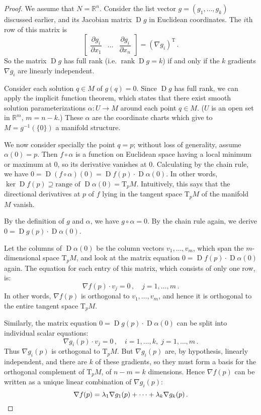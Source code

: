 \documentclass[12pt]{article}
\newcommand{\real}{\mathbb{R}}
\DeclareMathOperator{\D}{D}
\DeclareMathOperator{\rank}{rank}
\newcommand{\Tp}{\mathrm{T}_p}
\begin{document}
\begin{proof}
We assume that $N = \real^n$.
Consider the list vector $g = (g_1, \dotsc, g_k)$ discussed earlier,
and its Jacobian matrix $\D g$ in Euclidean coordinates.
The $i$th row of this matrix
is
\[
\begin{bmatrix} \dfrac{\partial g_i}{\partial x_1} & \hdots & \dfrac{\partial g_i}{\partial x_n} \end{bmatrix} = 
\left( \nabla g_i \right)^{\mathrm{T}}\,.
\]
So the matrix $\D g$ has full rank (i.e. $\rank \D g = k$) if and only
if the $k$ gradients $\nabla g_i$ are linearly independent.

Consider each solution $q \in M$ of $g(q) = 0$.
Since $\D g$ has full rank, we can apply the implicit function theorem, 
which states that there exist smooth solution parameterizations
$\alpha\colon U \to M$ around each point $q \in M$. ($U$ is an open set in $\real^m$, $m = n -k$.)
These $\alpha$ are the coordinate charts which give to $M = g^{-1}( \{ 0 \})$ a manifold structure.

We now consider specially the point $q = p$; without loss of generality, assume $\alpha(0) = p$.
Then $f \circ \alpha$ is a function on Euclidean space having a local minimum or maximum at $0$,
so its derivative vanishes at $0$.
Calculating by the chain rule, we have
$0 = \D (f \circ \alpha)(0) = \D f(p) \cdot \D \alpha(0)$.
In other words, $\ker \D f(p) \supseteq \textrm{range of } \D \alpha(0) = \Tp M$.
Intuitively, this says that the directional derivatives 
at $p$ of $f$ lying in the tangent space $\Tp M$ of the manifold $M$ vanish.

By the definition of $g$ and $\alpha$, we have $g \circ \alpha = 0$.
By the chain rule again, we derive $0 = \D g(p) \cdot \D \alpha(0)$.

Let the columns of $\D \alpha(0)$ be the column vectors $v_1, \dotsc, v_m$, which span the
$m$-dimensional space $\Tp M$,
and look at the matrix equation $0 = \D f(p) \cdot \D \alpha(0)$ again.
The equation for each entry of this matrix, which consists of only one row, is:
\[
\nabla f(p) \cdot v_j = 0\,, \quad j = 1, \dotsc, m\,.
\]
In other words, $\nabla f(p)$ is orthogonal to $v_1, \dotsc, v_m$,
and hence it is orthogonal to the entire tangent space $\Tp M$.

Similarly, the matrix equation $0 = \D g(p) \cdot \D \alpha(0)$ can be split into individual
scalar equations:
\[
\nabla g_i(p) \cdot v_j = 0\,, \quad i = 1, \dotsc, k,\; j = 1, \dotsc, m\,.
\]
Thus $\nabla g_i(p)$ is orthogonal to $\Tp M$.
But $\nabla g_i(p)$ are, by hypothesis, linearly independent,
and there are $k$ of these gradients, so they must form a basis for
the orthogonal complement of $\Tp M$, of $n - m = k$ dimensions.
Hence $\nabla f(p)$ can be written as a unique linear combination of $\nabla g_i(p)$:
\[
\nabla f(p) = \lambda_1 \nabla g_1(p) + \dotsb + \lambda_k \nabla g_k(p)\,. \qedhere
\]
\end{proof}
\end{document}

